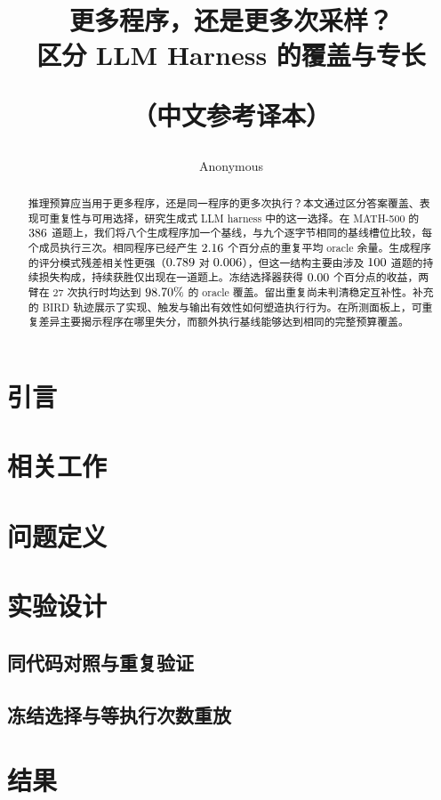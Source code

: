 \documentclass{article}
\title{更多程序，还是更多次采样？\\区分 LLM Harness 的覆盖与专长\par\bigskip\large（中文参考译本）}
\author{Anonymous}
\begin{document}
\maketitle
\begin{abstract}
推理预算应当用于更多程序，还是同一程序的更多次执行？本文通过区分答案覆盖、表现可重复性与可用选择，研究生成式 LLM harness 中的这一选择。在 MATH-500 的 $386$ 道题上，我们将八个生成程序加一个基线，与九个逐字节相同的基线槽位比较，每个成员执行三次。相同程序已经产生 $2.16$ 个百分点的重复平均 oracle 余量。生成程序的评分模式残差相关性更强（$0.789$ 对 $0.006$），但这一结构主要由涉及 $100$ 道题的持续损失构成，持续获胜仅出现在一道题上。冻结选择器获得 $0.00$ 个百分点的收益，两臂在 $27$ 次执行时均达到 $98.70\%$ 的 oracle 覆盖。留出重复尚未判清稳定互补性。补充的 BIRD 轨迹展示了实现、触发与输出有效性如何塑造执行行为。在所测面板上，可重复差异主要揭示程序在哪里失分，而额外执行基线能够达到相同的完整预算覆盖。
\end{abstract}
\section{引言}\label{sec:introduction}


\section{相关工作}\label{sec:related}


\section{问题定义}\label{sec:measures}


\section{实验设计}\label{sec:setup}

\subsection{同代码对照与重复验证}\label{sec:protocol}

\subsection{冻结选择与等执行次数重放}\label{sec:selection-design}


\section{结果}\label{sec:results}\label{sec:diagnosis}




\end{document}
